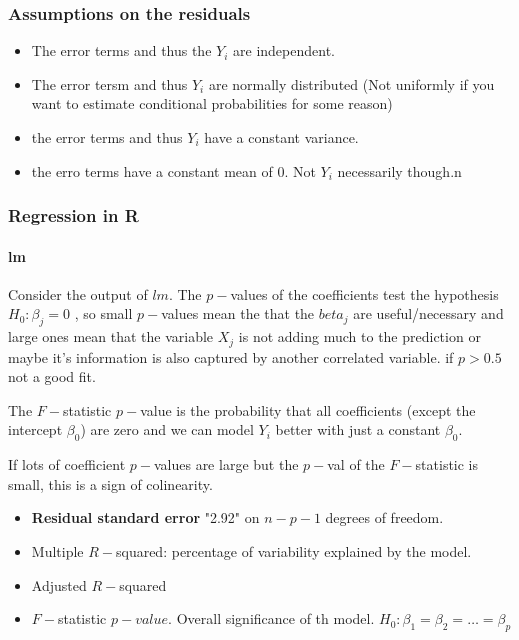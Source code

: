 \documentclass{article}
\begin{document}
\subsubsection{Assumptions on the residuals}
\begin{itemize}
\item The error terms and thus the $Y_i$ are independent. 
\item The error tersm and thus $Y_i$ are normally distributed (Not uniformly if you want to estimate conditional probabilities for some reason)
\item the error terms and thus $Y_i$ have a constant variance. 
\item the erro terms have a constant mean of 0. Not $Y_i$ necessarily though.n
\end{itemize}

\subsubsection{Regression in R}
\paragraph{lm}
Consider the output of $lm$. The $p-$values of the coefficients test the hypothesis $H_0 : \beta_j = 0$ , so small $p-$values mean the that the $beta_j$ are useful/necessary and large ones mean that the variable $X_j$ is not adding much to the prediction or maybe it's information is also captured by another correlated variable. if $p > 0.5$ not a good fit. 

The $F-$statistic $p-$value is the probability that all coefficients (except the intercept $\beta_0$) are zero and we can model $Y_i$ better with just a constant $\beta_0$. 


If lots of coefficient $p-$values are large but the $p-$val of the $F-$statistic is small, this is a sign of colinearity. 

\begin{itemize}
\item \textbf{Residual standard error} "2.92" on $n-p-1$ degrees of freedom. 
\item Multiple $R-$squared: percentage of variability explained by the model. 
\item Adjusted $R-$squared
\item $F-$statistic $p-value$. Overall significance of th model. $H_0: \beta_1 = \beta_2 = \dots = \beta_p$
\end{itemize}
\end{document}
